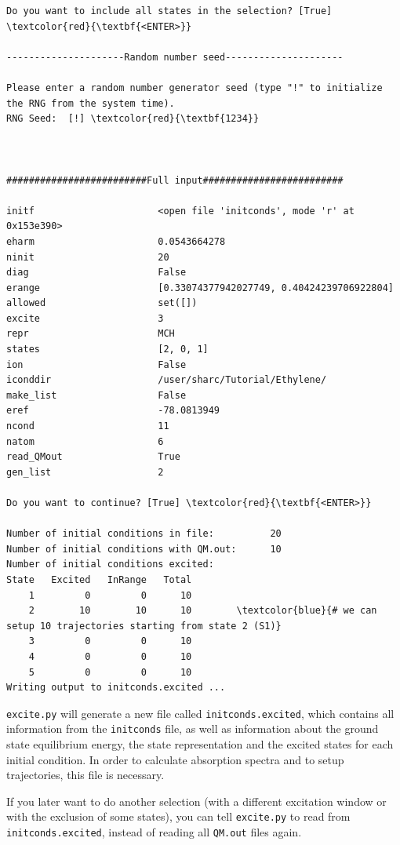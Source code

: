 \documentclass[a4paper,11pt,DIV=15,openany]{scrbook}
\newcommand{\ttt}[1]{\texttt{#1}}
\begin{document}
\begin{oframed}
\begin{Verbatim}[commandchars=\\\{\}]
Do you want to include all states in the selection? [True] \textcolor{red}{\textbf{<ENTER>}}

---------------------Random number seed---------------------

Please enter a random number generator seed (type "!" to initialize the RNG from the system time).
RNG Seed:  [!] \textcolor{red}{\textbf{1234}}



#########################Full input#########################

initf                      <open file 'initconds', mode 'r' at 0x153e390>
eharm                      0.0543664278
ninit                      20
diag                       False
erange                     [0.33074377942027749, 0.40424239706922804]
allowed                    set([])
excite                     3
repr                       MCH
states                     [2, 0, 1]
ion                        False
iconddir                   /user/sharc/Tutorial/Ethylene/
make_list                  False
eref                       -78.0813949
ncond                      11
natom                      6
read_QMout                 True
gen_list                   2

Do you want to continue? [True] \textcolor{red}{\textbf{<ENTER>}}

Number of initial conditions in file:          20
Number of initial conditions with QM.out:      10
Number of initial conditions excited:
State   Excited   InRange   Total
    1         0         0      10
    2        10        10      10        \textcolor{blue}{# we can setup 10 trajectories starting from state 2 (S1)}
    3         0         0      10
    4         0         0      10
    5         0         0      10
Writing output to initconds.excited ...
\end{Verbatim}
\end{oframed}

\normalsize

\ttt{excite.py} will generate a new file called \ttt{initconds.excited}, which contains all information from the \ttt{initconds} file, as well as information about the ground state equilibrium energy, the state representation and the excited states for each initial condition. In order to calculate absorption spectra and to setup trajectories, this file is necessary.

If you later want to do another selection (with a different excitation window or with the exclusion of some states), you can tell \ttt{excite.py} to read from \ttt{initconds.excited}, instead of reading all \ttt{QM.out} files again. 
\end{document}
